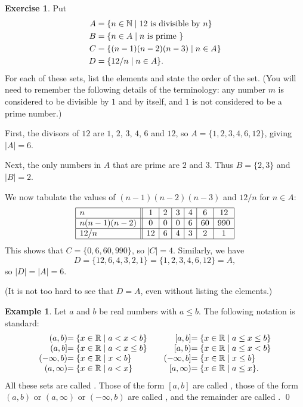 \documentclass[a4paper]{book}
\theoremstyle{definition}
\newtheorem{example}[theorem]{Example}
\newtheorem{exercise}[theorem]{Exercise}
\renewenvironment{solution}{\SolutionInline}{\endSolutionInline}
\begin{document}
\begin{exercise}
 Put
 \begin{align*}
  A &= \{ n\in{\mathbb{N}} \;|\; 12 \text{ is divisible by } n\} \\
  B &= \{ n\in A\;|\; n \text{ is prime }\} \\
  C &= \{ (n-1)(n-2)(n-3) \;|\; n\in A\} \\
  D &= \{ 12/n \;|\; n\in A\}.
 \end{align*}
 For each of these sets, list the elements and state the order of the
 set.  (You will need to remember the following details of the
 terminology: any number $m$ is considered to be divisible by $1$ and
 by itself, and $1$ is not considered to be a prime number.)
\end{exercise}
\begin{solution}
 First, the divisors of $12$ are $1$, $2$, $3$, $4$, $6$ and $12$, so
 $A=\{1,2,3,4,6,12\}$, giving $|A|=6$.

 Next, the only numbers in $A$ that are prime are $2$ and $3$.  Thus
 $B=\{2,3\}$ and $|B|=2$.

 We now tabulate the values of $(n-1)(n-2)(n-3)$ and $12/n$ for
 $n\in A$: 
 \[ \begin{array}{|l||c|c|c|c|c|c|}
   \hline
    n           &  1 &  2 &  3 &  4 &  6 & 12  \\ \hline
    n(n-1)(n-2) &  0 &  0 &  0 &  6 & 60 & 990 \\ \hline
    12/n        & 12 &  6 &  4 &  3 &  2 &  1  \\ \hline
 \end{array} \]
 This shows that $C=\{0,6,60,990\}$, so $|C|=4$.  Similarly, we have 
 \[ D = \{12,6,4,3,2,1\} = \{1,2,3,4,6,12\} = A, \]
 so $|D|=|A|=6$.

 (It is not too hard to see that $D=A$, even without listing the
 elements.)
\end{solution}

\begin{example}
 Let $a$ and $b$ be real numbers with $a\leq b$.  The following
 notation is standard:
 \[ \setlength{\arraycolsep}{0em} 
  \begin{array}{rlcrl}
  (a,b) &= \{x\in\R\st a<x<b\} &\hspace{2em}&
  [a,b] &= \{x\in\R\st a\leq x\leq b\} \\
  (a,b] &= \{x\in\R\st a<x\leq b\} &&
  [a,b) &= \{x\in\R\st a\leq x<b\} \\
  (-\infty,b) &= \{x\in\R \st x<b\} &&
  (-\infty,b] &= \{x\in\R \st x\leq b\} \\
  (a,\infty)  &= \{x\in\R \st a<x\} &&
  [a,\infty)  &= \{x\in\R \st a\leq x\}.
 \end{array} \]
 All these sets are called .  Those of the form
 $[a,b]$ are called , those of the form $(a,b)$
 or $(a,\infty)$ or $(-\infty,b)$ are called ,
 and the remainder are called . \qed
\end{example}
\end{document}

